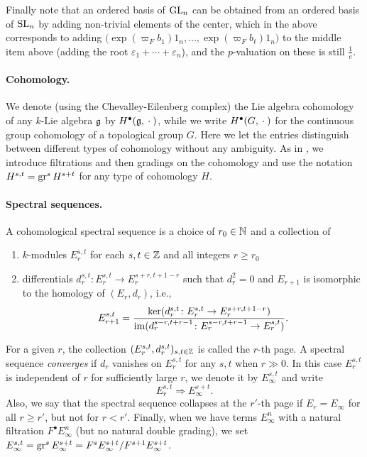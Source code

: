 Finally note that an ordered basis of $\operatorname{GL}_{n}$ can be obtained from an ordered basis of $\operatorname{SL}_{n}$ by adding non-trivial elements of the center, which in the above corresponds to adding $\bigl(  \exp(\varpi_{F}b_{1})1_{n}, \dotsc, \exp(\varpi_{F}b_{\ell})1_{n} \bigr)$ to the middle item above (adding the root $\varepsilon_{1} + \dotsb + \varepsilon_{n}$), and the $p$-valuation on these is still $\frac{1}{e}$.

\paragraph{Cohomology.} We denote (using the Chevalley-Eilenberg complex) the Lie algebra cohomology of any $k$-Lie algebra $\mathfrak{g}$ by $H^{\bullet}(\mathfrak{g}, \:\cdot\:)$, while we write $H^{\bullet}(G,\:\cdot\:)$ for the continuous group cohomology of a topological group $G$. Here we let the entries distinguish between different types of cohomology without any ambiguity. As in , we introduce filtrations and then gradings on the cohomology and use the notation $H^{s,t} = \operatorname{gr}^{s}H^{s+t}$ for any type of cohomology $H$.

\paragraph{Spectral sequences.} A cohomological spectral sequence is a choice of $r_0 \in \mathbb{N}$ and a collection of
\begin{enumerate}[$\bullet$]
  \item $k$-modules $E_r^{s,t}$ for each $s,t \in \mathbb{Z}$ and all integers $r \geq r_0$
  \item differentials $d_r^{s,t} \colon E_r^{s,t} \to E_r^{s+r,t+1-r}$ such that $d_r^2 = 0$ and $E_{r+1}$ is isomorphic to the homology of $(E_r,d_r)$, i.e.,
  \[
    E_{r+1}^{s,t} = \frac{\operatorname{ker}(d_r^{s,t} \colon E_r^{s,t} \to E_r^{s+r,t+1-r})}{\operatorname{im}(d_r^{s-r,t+r-1} \colon E_r^{s-r,t+r-1} \to E_r^{s,t})}.
  \]
\end{enumerate}
For a given $r$, the collection $(E_r^{s,t},d_r^{s,t})_{s,t\in\mathbb{Z}}$ is called the $r$-th page. A spectral sequence \emph{converges} if $d_r$ vanishes on $E_r^{s,t}$ for any $s,t$ when $r\gg0$. In this case $E_r^{s,t}$ is independent of $r$ for sufficiently large $r$, we denote it by $E_{\infty}^{s,t}$ and write
  \[
    E_{r}^{s,t} \Longrightarrow E_\infty^{s+t}.
  \]
Also, we say that the spectral sequence collapses at the $r'$-th page if $E_{r} = E_{\infty}$ for all $r \geq r'$, but not for $r < r'$. Finally, when we have terms $E_\infty^{n}$  with a natural filtration $F^\bullet E_\infty^n$ (but no natural double grading), we set $E_\infty^{s,t} = \operatorname{gr}^{s} E_\infty^{s+t}= F^{s}E_\infty^{s+t}/F^{s+1}E_\infty^{s+t}$.

